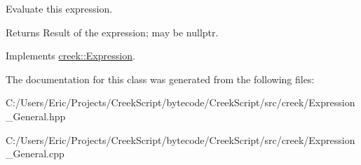 Evaluate this expression. 

\begin{DoxyReturn}{Returns}
Result of the expression; may be {\ttfamily nullptr}. 
\end{DoxyReturn}


Implements \hyperlink{classcreek_1_1_expression_a3c7fe4a04e24c8d907f918240e2bf43d}{creek\+::\+Expression}.



The documentation for this class was generated from the following files\+:\begin{DoxyCompactItemize}
\item 
C\+:/\+Users/\+Eric/\+Projects/\+Creek\+Script/bytecode/\+Creek\+Script/src/creek/Expression\+\_\+\+General.\+hpp\item 
C\+:/\+Users/\+Eric/\+Projects/\+Creek\+Script/bytecode/\+Creek\+Script/src/creek/Expression\+\_\+\+General.\+cpp\end{DoxyCompactItemize}
